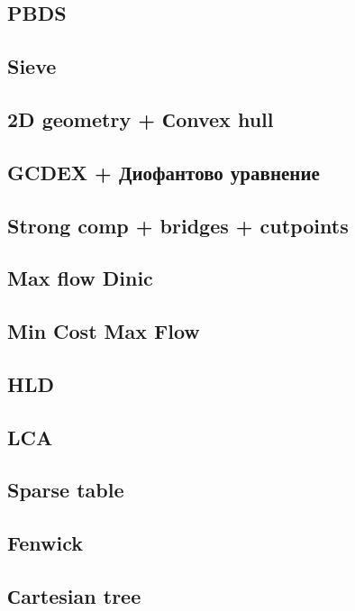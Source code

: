 \documentclass[10pt]{article}
\begin{document}
\begin{multicols}{2}
\subsection{PBDS}

\subsection{Sieve}

\subsection{2D geometry + Сonvex hull}

\subsection{GCDEX + Диофантово уравнение}

\subsection{Strong comp + bridges + cutpoints}

\subsection{Max flow Dinic}

\subsection{Min Cost Max Flow}

\subsection{HLD}

\subsection{LCA}

\subsection{Sparse table}

\subsection{Fenwick}

\subsection{Сartesian tree}


\end{multicols}
\end{document}
